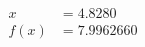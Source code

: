 \documentclass[preview]{standalone}
\begin{document}
\begin{align*}
x &= 4.8280\\f(x) &= 7.9962660
\end{align*}
\end{document}
